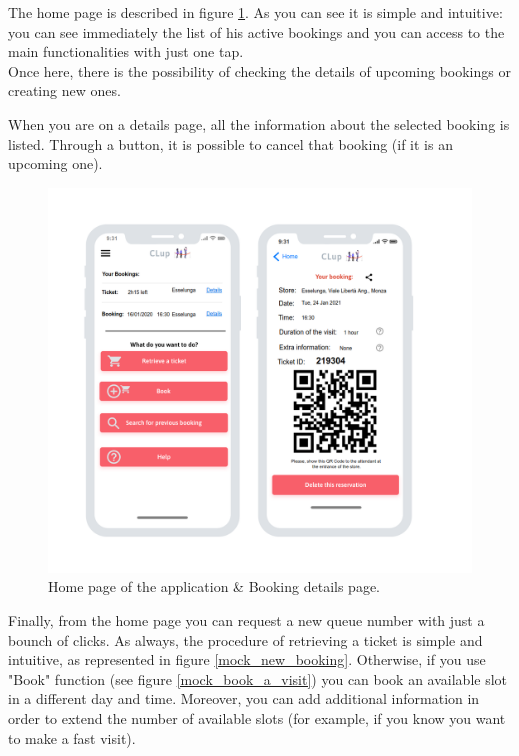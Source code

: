\documentclass[table, 12pt]{article}
\begin{document}
The home page is described in figure \ref{mock_bookings}. As you can see it is simple and intuitive: you can see immediately the list of his active bookings and you can access to the main functionalities with just one tap.\\
Once here, there is the possibility of checking the details of upcoming bookings or creating new ones.

When you are on a details page, all the information about the selected booking is listed. Through a button, it is possible to cancel that booking (if it is an upcoming one).

\begin{figure}[H]
    \begin{center}
        \includegraphics[width=\textwidth]{assets/Mockups/new_mock/home_page__booking_details.png}
        \caption{Home page of the application \& Booking details page.}
        \label{mock_bookings}
    \end{center}
\end{figure}

Finally, from the home page you can request a new queue number with just a bounch of clicks. As always, the procedure of retrieving a ticket is simple and intuitive, as represented in figure \ref{mock_new_booking}.
Otherwise, if you use "Book" function (see figure \ref{mock_book_a_visit}) you can book an available slot in a different day and time. Moreover, you can add additional information in order to extend the number of available slots (for example, if you know you want to make a fast visit).
\end{document}
